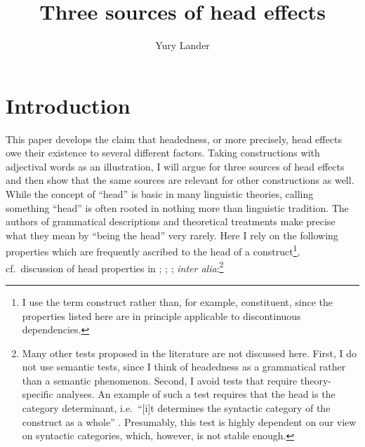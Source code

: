 \documentclass[output=paper,nobabel,draftmode  ,colorlinks, citecolor=brown]{langscibook}
\title{Three sources of head effects}
\author{Yury Lander\orcid{0000-0003-1798-7174}\affiliation{HSE University, Moscow}}
\begin{document}
\maketitle

\largerpage[-1]
\section{Introduction}\label{sec-intro-lan}
This paper develops the claim that headedness, or more precisely, head effects owe their existence to several different factors. Taking constructions with adjectival words as an illustration, I will argue for three sources of head effects and then show that the same sources are relevant for other constructions as well. 
While the concept of ``head'' is basic in many linguistic theories, calling something ``head'' is
often rooted in nothing more than linguistic tradition. The authors of grammatical descriptions and
theoretical treatments make precise what they mean by ``being the head'' very rarely. Here I rely on
the following properties which are frequently ascribed to the head of a construct\footnote{I use the
  term construct rather than, for example, constituent, since the properties listed here are in
  principle applicable to discontinuous dependencies.}, cf.\ discussion of head properties in
\citet{Zwicky85a}; \citet{CFMcG93a-ed}; \citet{Croft1996};  \citet[242--254]{Croft2002} \emph{inter
  alia}:\footnote{Many other tests proposed in the literature are not discussed here. First, I do
  not use semantic tests, since I think of headedness as a grammatical rather than a semantic
  phenomenon. Second, I avoid tests that require theory-specific analyses. An example of such a test
  requires that the head is the category determinant, i.e.\ ``[i]t determines the syntactic category of the construct as a whole'' \citep[297]{Zwicky1993}. Presumably, this test is highly dependent on our view on syntactic categories, which, however, is not stable enough.}
\end{document}
